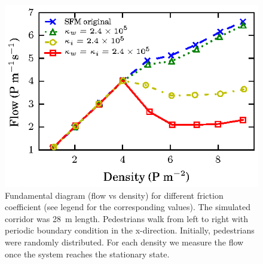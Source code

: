 \begin{figure}[htbp!]
\includegraphics[width=\columnwidth]
{plots/flow-density_pasillo22m_fgmodified_multi.eps}
\caption{\label{fgmodified-w22} Fundamental diagram (flow vs density) for different friction coefficient (see legend for the corresponding values). The simulated corridor was 28~m length. Pedestrians walk from left to right with periodic boundary condition in the x-direction. Initially, pedestrians were randomly distributed. For each density we measure the flow once the system reaches the stationary state.}
\end{figure}


